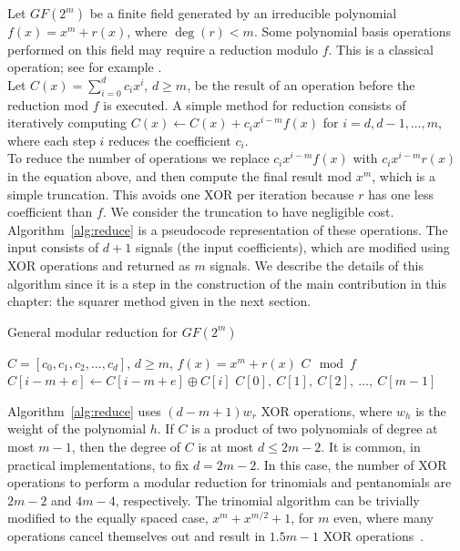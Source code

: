 Let $GF(2^m)$ be a finite field generated by an irreducible polynomial $f(x) = x^m + r(x)$, where $\deg(r) < m$. Some polynomial basis operations performed on this field may require a reduction modulo $f$. This is a classical operation; see for example \cite[Chapter~2.3.5]{hankerson2006guide}.\\

Let $C(x) = \sum_{i=0}^{d} c_i x^i$, $d \geq m$, be the result of an operation before the reduction mod $f$ is executed. A simple method for reduction consists of iteratively computing $C(x) \leftarrow C(x) + c_{i} x^{i-m} f(x)$ for $i = d, d-1, \ldots, m$, where each step $i$ reduces the coefficient $c_{i}$.\\

To reduce the number of operations we replace $c_{i} x^{i-m} f(x)$ with $c_{i} x^{i-m} r(x)$ in the equation above, and then compute the final result mod $x^m$, which is a simple truncation. This avoids one XOR per iteration because $r$ has one less coefficient than $f$. We consider the truncation to have negligible cost. Algorithm~\ref{alg:reduce} is a pseudocode representation of these operations. The input consists of $d+1$ signals (the input coefficients), which are modified using XOR operations and returned as $m$ signals. We describe the details of this algorithm since it is a step in the construction of the main contribution in this chapter: the squarer method given in the next section. \\

\begin{algorithm}
\caption{General modular reduction for $GF(2^m)$}
\label{alg:reduce}
\begin{algorithmic}[1]
\REQUIRE $C = [c_0, c_1, c_2, ..., c_d]$, $d \geq m$, $f(x) = x^m + r(x)$
\ENSURE $C \mod f$
\STATE $C[i-m+e] \leftarrow C[i-m+e] \oplus C[i]$ \label{alg:reduce:op}
\ENDFOR
\ENDFOR
\RETURN $C[0],~C[1],~C[2],~\ldots,~C[m-1]$
\end{algorithmic}
\end{algorithm}

Algorithm~\ref{alg:reduce} uses $(d-m+1)w_r$ XOR operations, where $w_h$ is the weight of the polynomial $h$. If $C$ is a product of two polynomials of degree at most $m-1$, then the degree of $C$ is at most $d \leq 2m-2$. It is common, in practical implementations, to fix $d=2m-2$. In this case, the number of XOR operations to perform a modular reduction for trinomials and pentanomials are $2m-2$ and $4m-4$, respectively. The trinomial algorithm can be trivially modified to the equally spaced case, $x^m+x^{m/2}+1$, for $m$ even, where many operations cancel themselves out and result in $1.5 m - 1$ XOR operations~\cite{wu2002bit}.\\

